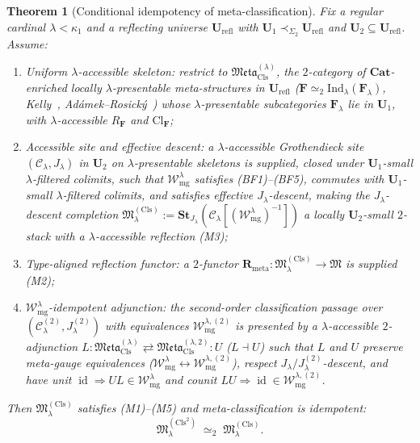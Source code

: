 \documentclass[11pt]{article}
\theoremstyle{plain}
\newtheorem{theorem}{Theorem}[section]
\theoremstyle{definition}
\newcommand{\cC}{\mathcal{C}}
\newcommand{\fM}{\mathfrak{M}}
\newcommand{\Meta}{\mathfrak{Meta}}
\newcommand{\Cl}{\mathrm{Cl}}
\DeclareMathOperator{\id}{id}
\begin{document}
\begin{theorem}[Conditional idempotency of meta-classification]\label{thm:meta-conditional-idem}
Fix a regular cardinal $\lambda < \kappa_1$ and a reflecting universe $\mathbf{U}_{\mathrm{refl}}$ with $\mathbf{U}_1 \prec_{\Sigma_2} \mathbf{U}_{\mathrm{refl}}$ and $\mathbf{U}_2 \subseteq \mathbf{U}_{\mathrm{refl}}$. Assume:
\begin{enumerate}[nosep,label=\textup{(Idem-\arabic*)}]
\item \emph{Uniform $\lambda$-accessible skeleton}: restrict to $\Meta_{\mathrm{Cls}}^{(\lambda)}$, the $2$-category of $\mathbf{Cat}$-enriched locally $\lambda$-presentable meta-structures in $\mathbf{U}_{\mathrm{refl}}$ ($\mathbf{F} \simeq_2 \mathrm{Ind}_\lambda(\mathbf{F}_\lambda)$, Kelly~\cite{Kelly1982}, Ad\'amek--Rosick\'y~\cite{AdamekRosicky1994}) whose $\lambda$-presentable subcategories $\mathbf{F}_\lambda$ lie in $\mathbf{U}_1$, with $\lambda$-accessible $R_{\mathbf{F}}$ and $\Cl_{\mathbf{F}}$;
\item \emph{Accessible site and effective descent}: a $\lambda$-accessible Grothendieck site $(\cC_\lambda, J_\lambda)$ in $\mathbf{U}_2$ on $\lambda$-presentable skeletons is supplied, closed under $\mathbf{U}_1$-small $\lambda$-filtered colimits, such that $\mathcal{W}_{\mathrm{mg}}^\lambda$ satisfies \textup{(BF1)--(BF5)}, commutes with $\mathbf{U}_1$-small $\lambda$-filtered colimits, and satisfies effective $J_\lambda$-descent, making the $J_\lambda$-descent completion $\fM^{(\mathrm{Cls})}_\lambda := \mathbf{St}_{J_\lambda}(\cC_\lambda[(\mathcal{W}_{\mathrm{mg}}^\lambda)^{-1}])$ a locally $\mathbf{U}_2$-small $2$-stack with a $\lambda$-accessible reflection \textup{(M3)};
\item \emph{Type-aligned reflection functor}: a $2$-functor $\mathbf{R}_{\mathrm{meta}} : \fM^{(\mathrm{Cls})}_\lambda \to \fM$ is supplied \textup{(M2)};
\item \emph{$\mathcal{W}_{\mathrm{mg}}^\lambda$-idempotent adjunction}: the second-order classification passage over $(\cC_\lambda^{(2)}, J_\lambda^{(2)})$ with equivalences $\mathcal{W}_{\mathrm{mg}}^{\lambda,(2)}$ is presented by a $\lambda$-accessible $2$-adjunction $L : \Meta_{\mathrm{Cls}}^{(\lambda)} \rightleftarrows \Meta_{\mathrm{Cls}}^{(\lambda, 2)} : U$ ($L \dashv U$) such that $L$ and $U$ preserve meta-gauge equivalences ($\mathcal{W}_{\mathrm{mg}}^\lambda \leftrightarrow \mathcal{W}_{\mathrm{mg}}^{\lambda,(2)}$), respect $J_\lambda/J_\lambda^{(2)}$-descent, and have unit $\id \Rightarrow U L \in \mathcal{W}_{\mathrm{mg}}^\lambda$ and counit $L U \Rightarrow \id \in \mathcal{W}_{\mathrm{mg}}^{\lambda,(2)}$.
\end{enumerate}
Then $\fM^{(\mathrm{Cls})}_\lambda$ satisfies \textup{(M1)--(M5)} and meta-classification is idempotent:
\[
  \fM^{(\mathrm{Cls}^2)}_\lambda \;\simeq_2\; \fM^{(\mathrm{Cls})}_\lambda.
\]
\end{theorem}
\end{document}
